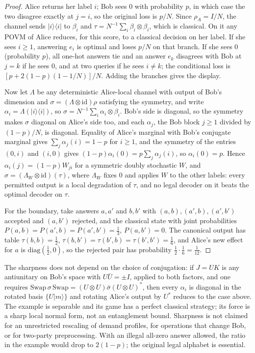 \begin{proof}
Alice returns her label $i$; Bob sees $0$ with probability $p$, in which case the two disagree exactly at $j=i$, so the
original loss is $p/N$. Since $\rho_A=I/N$, the channel sends $|i\rangle\langle i|$ to $\beta_i$ and
$\tau=N^{-1}\sum_i\beta_i\otimes\beta_i$, which is classical. On it any POVM of Alice reduces, for this score, to a classical
decision on her label. If she sees $i\ge1$, answering $e_i$ is optimal and loses $p/N$ on that branch. If she sees $0$
(probability $p$), all one-hot answers tie and an answer $e_k$ disagrees with Bob at $j=k$ if he sees $0$, and at two
queries if he sees $i\ne k$; the conditional loss is $[p+2(1-p)(1-1/N)]/N$. Adding the branches gives the display.

Now let $\Lambda$ be any deterministic Alice-local channel with output of Bob's dimension and $\sigma=(\Lambda\otimes\mathrm{id})\rho$
satisfying the symmetry, and write $\alpha_i=\Lambda(|i\rangle\langle i|)$, so $\sigma=N^{-1}\sum_i\alpha_i\otimes\beta_i$. Bob's side is
diagonal, so the symmetry makes $\sigma$ diagonal on Alice's side too, and each $\alpha_j$, the Bob block $j\ge1$ divided by
$(1-p)/N$, is diagonal. Equality of Alice's marginal with Bob's conjugate marginal gives $\sum_j\alpha_j(i)=1-p$ for $i\ge1$,
and the symmetry of the entries $(0,i)$ and $(i,0)$ gives $(1-p)\alpha_i(0)=p\sum_j\alpha_j(i)$, so $\alpha_i(0)=p$. Hence
$\alpha_i(j)=(1-p)W_{ji}$ for a symmetric doubly stochastic $W$, and $\sigma=(\Lambda_W\otimes\mathrm{id})(\tau)$, where $\Lambda_W$ fixes
$0$ and applies $W$ to the other labels: every permitted output is a local degradation of $\tau$, and no legal decoder on
it beats the optimal decoder on $\tau$.

For the boundary, take answers $a,a'$ and $b,b'$ with $(a,b),(a',b),(a',b')$ accepted and $(a,b')$ rejected, and the
classical state with joint probabilities $P(a,b)=P(a',b)=P(a',b')=\frac13$, $P(a,b')=0$. The canonical output has table
$\tau(b,b)=\frac12$, $\tau(b,b')=\tau(b',b)=\tau(b',b')=\frac16$, and Alice's new effect for $a$ is $\mathrm{diag}(\frac12,0)$, so
the rejected pair has probability $\frac12\cdot\frac16=\frac1{12}$.
\end{proof}

The sharpness does not depend on the choice of conjugation: if $J=UK$ is any antiunitary on Bob's space with $U\bar U=\pm I$,
applied to both factors, and one requires $\mathrm{Swap}\,\sigma\,\mathrm{Swap}=(U\otimes U)\bar\sigma(U\otimes U)^*$, then every
$\alpha_i$ is diagonal in the rotated basis $\{U|m\rangle\}$ and rotating Alice's output by $U^*$ reduces to the case above. The example is separable and its game has a
perfect classical strategy; its force is a sharp local normal form, not an entanglement bound. Sharpness is not claimed for an unrestricted rescaling of demand profiles, for operations that change
Bob, or for two-party preprocessing. With an illegal all-zero answer allowed, the ratio in the example would drop to
$2(1-p)$; the original legal alphabet is essential.

